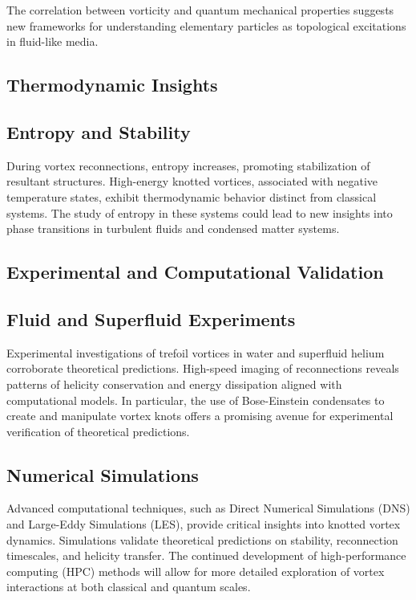 The correlation between vorticity and quantum mechanical properties suggests new frameworks for understanding elementary particles as topological excitations in fluid-like media.


\subsection*{Thermodynamic Insights}


\subsection*{Entropy and Stability}


During vortex reconnections, entropy increases, promoting stabilization of resultant structures. High-energy knotted vortices, associated with negative temperature states, exhibit thermodynamic behavior distinct from classical systems. The study of entropy in these systems could lead to new insights into phase transitions in turbulent fluids and condensed matter systems.


\subsection*{Experimental and Computational Validation}


\subsection*{Fluid and Superfluid Experiments}


Experimental investigations of trefoil vortices in water and superfluid helium corroborate theoretical predictions. High-speed imaging of reconnections reveals patterns of helicity conservation and energy dissipation aligned with computational models. In particular, the use of Bose-Einstein condensates to create and manipulate vortex knots offers a promising avenue for experimental verification of theoretical predictions.


\subsection*{Numerical Simulations}


Advanced computational techniques, such as Direct Numerical Simulations (DNS) and Large-Eddy Simulations (LES), provide critical insights into knotted vortex dynamics. Simulations validate theoretical predictions on stability, reconnection timescales, and helicity transfer. The continued development of high-performance computing (HPC) methods will allow for more detailed exploration of vortex interactions at both classical and quantum scales.


